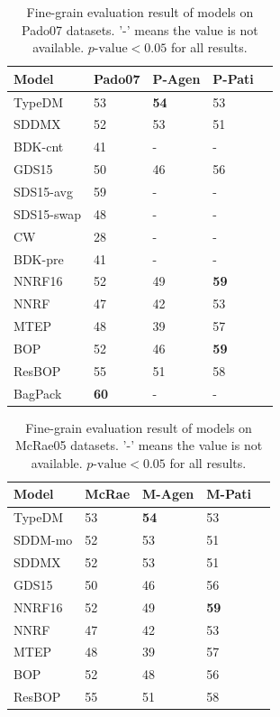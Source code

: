 \documentclass[a4paper]{article}
\begin{document}
\begin{table}[t]
\centering
\begin{tabular}{l||llll}
\textbf{Model}  &   Pado07 &   P-Agen   &   P-Pati \\ \hline
TypeDM      &   53      &\textbf{54}&   53          \\
SDDMX       &   52      &   53      &   51          \\
BDK-cnt     &   41      &   -       &   -           \\
GDS15       &   50      &   46      &   56          \\  
SDS15-avg   &   59      &   -       &   -           \\
SDS15-swap  &   48      &   -       &   -           \\\hline
CW          &   28      &   -       &   -           \\
BDK-pre     &   41      &   -       &   -           \\
NNRF16      &   52      &   49      &   \textbf{59} \\
NNRF        &   47      &   42      &   53          \\
MTEP        &   48      &   39      &   57          \\
BOP         &   52      &   46      &   \textbf{59} \\
ResBOP      &   55      &   51      &   58          \\  \hline
BagPack     &\textbf{60}&   -       &   -           \\
\end{tabular}
\caption{\label{tab:eval-thematic-pado07} Fine-grain evaluation result of models on Pado07 datasets. '-' means the value is not available.  $p\text{-value} < 0.05$ for all results. }
\end{table}


\begin{table}[t]
\centering
\begin{tabular}{l||llll}
\textbf{Model}  &   McRae &   M-Agen   &   M-Pati   \\ \hline
TypeDM      &   53      &\textbf{54}&   53          \\
SDDM-mo     &   52      &   53      &   51          \\
SDDMX       &   52      &   53      &   51          \\
GDS15       &   50      &   46      &   56          \\  \hline
NNRF16      &   52      &   49      &\textbf{59}    \\
NNRF        &   47      &   42      &   53          \\
MTEP        &   48      &   39      &   57          \\
BOP         &   52      &   48      &   56          \\
ResBOP      &   55      &   51      &   58          \\
\end{tabular}
\caption{\label{tab:eval-thematic-mcrae05} Fine-grain evaluation result of models on McRae05 datasets. '-' means the value is not available. $p\text{-value} < 0.05$ for all results. }
\end{table}
\end{document}
